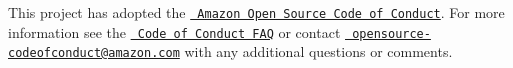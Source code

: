 This project has adopted the \href{https://aws.github.io/code-of-conduct}{\texttt{ Amazon Open Source Code of Conduct}}. For more information see the \href{https://aws.github.io/code-of-conduct-faq}{\texttt{ Code of Conduct FAQ}} or contact \href{mailto:opensource-codeofconduct@amazon.com}{\texttt{ opensource-\/codeofconduct@amazon.\+com}} with any additional questions or comments. 